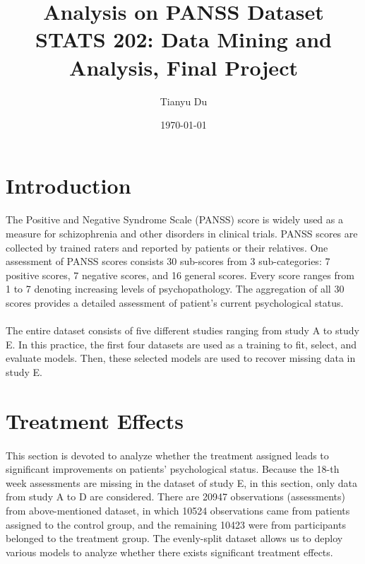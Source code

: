 \documentclass[11pt]{article}
\title{Analysis on PANSS Dataset\\ \small STATS 202: Data Mining and Analysis, Final Project}
\author{Tianyu Du}
\date{\today}
\begin{document}
	\maketitle
	\tableofcontents

	\section{Introduction}
	\paragraph{}The Positive and Negative Syndrome Scale (PANSS) score is widely used as a measure for schizophrenia and other disorders in clinical trials. PANSS scores are collected by trained raters and reported by patients or their relatives. One assessment of PANSS scores consists 30 sub-scores from 3 sub-categories: 7 positive scores, 7 negative scores, and 16 general scores. Every score ranges from 1 to 7 denoting increasing levels of psychopathology. The aggregation of all 30 scores provides a detailed assessment of patient's current psychological status.
	
	\paragraph{}The entire dataset consists of five different studies ranging from study A to study E. In this practice, the first four datasets are used as a training to fit, select, and evaluate models. Then, these selected models are used to recover missing data in study E.
	
	\section{Treatment Effects}
	\paragraph{}This section is devoted to analyze whether the treatment assigned leads to significant improvements on patients' psychological status. Because the 18-th week assessments are missing in the dataset of study E, in this section, only data from study A to D are considered. There are 20947 observations (assessments) from above-mentioned dataset, in which 10524 observations came from patients assigned to the control group, and the remaining 10423 were from participants belonged to the treatment group. The evenly-split dataset allows us to deploy various models to analyze whether there exists significant treatment effects.
	
\end{document}
